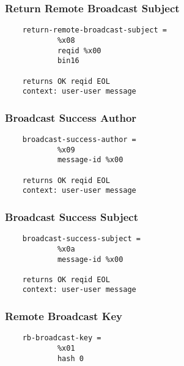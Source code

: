 \documentclass[letterpaper,11pt,oneside]{article}
\begin{document}
\subsubsection{Return Remote Broadcast Subject}

\vspace{10pt}
\begin{verbatim}
    return-remote-broadcast-subject =
            %x08
            reqid %x00
            bin16

    returns OK reqid EOL
    context: user-user message
\end{verbatim}
\vspace{10pt}


\subsubsection{Broadcast Success Author}

\vspace{10pt}
\begin{verbatim}
    broadcast-success-author =
            %x09
            message-id %x00

    returns OK reqid EOL
    context: user-user message
\end{verbatim}
\vspace{10pt}


\subsubsection{Broadcast Success Subject}

\vspace{10pt}
\begin{verbatim}
    broadcast-success-subject =
            %x0a
            message-id %x00

    returns OK reqid EOL
    context: user-user message
\end{verbatim}
\vspace{10pt}


\subsubsection{Remote Broadcast Key}

\vspace{10pt}
\begin{verbatim}
    rb-broadcast-key =
            %x01
            hash 0 
\end{verbatim}
\vspace{10pt}
\end{document}
